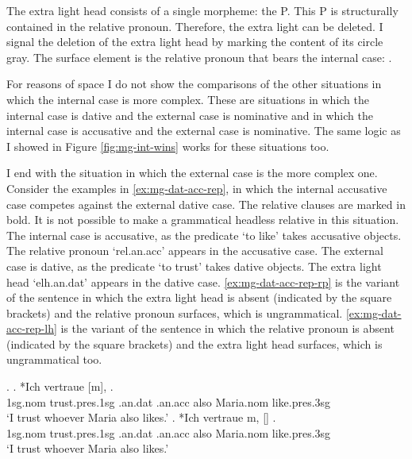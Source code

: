 The extra light head consists of a single morpheme: the P.
This P is structurally contained in the relative pronoun. Therefore, the extra light can be deleted. I signal the deletion of the extra light head by marking the content of its circle gray.
The surface element is the relative pronoun that bears the internal case: .

For reasons of space I do not show the comparisons of the other situations in which the internal case is more complex. These are situations in which the internal case is dative and the external case is nominative and in which the internal case is accusative and the external case is nominative. The same logic as I showed in Figure \ref{fig:mg-int-wins} works for these situations too.

I end with the situation in which the external case is the more complex one.
Consider the examples in \ref{ex:mg-dat-acc-rep}, in which the internal accusative case competes against the external dative case. The relative clauses are marked in bold. It is not possible to make a grammatical headless relative in this situation.
The internal case is accusative, as the predicate  `to like' takes accusative objects. The relative pronoun  `\ac{rel}.\ac{an}.\ac{acc}' appears in the accusative case.
The external case is dative, as the predicate  `to trust' takes dative objects. The extra light head  `\ac{elh}.\ac{an}.\ac{dat}' appears in the dative case.
\ref{ex:mg-dat-acc-rep-rp} is the variant of the sentence in which the extra light head is absent (indicated by the square brackets) and the relative pronoun surfaces, which is ungrammatical.
\ref{ex:mg-dat-acc-rep-lh} is the variant of the sentence in which the relative pronoun is absent (indicated by the square brackets) and the extra light head surfaces, which is ungrammatical too.

\ex.\label{ex:mg-dat-acc-rep}
\ag. *Ich vertraue [m],    .\\
1\ac{sg}.\ac{nom} trust.\ac{pres}.1\ac{sg}\scsub{[dat]} .\ac{an}.\ac{dat} .\ac{an}.\ac{acc} also Maria.\ac{nom} like.\ac{pres}.3\ac{sg}\scsub{[acc]}\\
`I trust whoever Maria also likes.' \label{ex:mg-dat-acc-rep-rp}
\bg. *Ich vertraue m, []   .\\
1\ac{sg}.\ac{nom} trust.\ac{pres}.1\ac{sg}\scsub{[dat]} .\ac{an}.\ac{dat} .\ac{an}.\ac{acc} also Maria.\ac{nom} like.\ac{pres}.3\ac{sg}\scsub{[acc]}\\
`I trust whoever Maria also likes.' \label{ex:mg-dat-acc-rep-lh}

